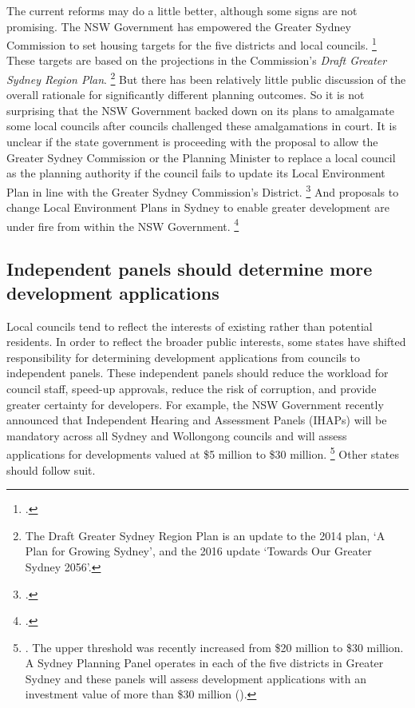 The current reforms may do a little better, although some signs are not promising.
The NSW Government has empowered the Greater Sydney Commission to set housing targets for the five districts and local councils.%
	\footcite{NSWGovFirstHome2017}
These targets are based on the projections in the Commission's \emph{Draft Greater Sydney Region Plan}.%
	\footnote{The Draft Greater Sydney Region Plan is an update to the 2014 plan, `A Plan for Growing Sydney', and the 2016 update `Towards Our Greater Sydney 2056'.}
But there has been relatively little public discussion of the overall rationale for significantly different planning outcomes.
So it is not surprising that the NSW Government backed down on its plans to amalgamate some local councils after councils challenged these amalgamations in court.
It is unclear if the state government is proceeding with the proposal to allow the Greater Sydney Commission or the Planning Minister to replace a local council as the planning authority if the council fails to update its Local Environment Plan in line with the Greater Sydney Commission's District.%
	\footcite{Stevens-2017-Report-to-NSW-Premier-Housing-affordaibility}
And proposals to change Local Environment Plans in Sydney to enable greater development are under fire from within the NSW Government.%
	\footcite{OKeefe-2017-Threats-revolt-controversial-plans-increasing-Syd-pop}

\subsection{Independent panels should determine more development applications}\label{subsec:independent-panels-should-determine-more-development-applications}

Local councils tend to reflect the interests of existing rather than potential residents.
In order to reflect the broader public interests, some states have shifted responsibility for determining development applications from councils to independent panels.
These independent panels should reduce the workload for council staff, speed-up approvals, reduce the risk of corruption, and provide greater certainty for developers.
For example, the NSW Government recently announced that Independent Hearing and Assessment Panels (IHAPs) will be mandatory across all Sydney and Wollongong councils and will assess applications for developments valued at \$5 million to \$30 million.%
	\footnote{\textcite{NSWDPE2017ihaps}. The upper threshold was recently increased from \$20 million to \$30 million. A Sydney Planning Panel operates in each of the five districts in Greater Sydney and these panels will assess development applications with an investment value of more than \$30 million (\textcite{NSWDPE2017_sydney_planning_panels}).}
Other states should follow suit.


